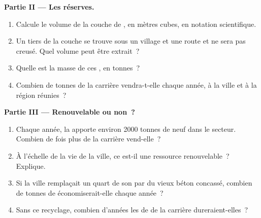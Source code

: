 \begin{problem}
\noindent\textbf{Partie II --- Les réserves.}\par\nopagebreak
\begin{enumerate}[resume, beginpenalty=10000]
  \item Calcule le volume de la couche de , en mètres cubes, en
        notation scientifique.
  \item Un tiers de la couche se trouve sous un village et une route et ne
        sera pas creusé. Quel volume peut être extrait~?
  \item Quelle est la masse de ces , en tonnes~?
  \item Combien de tonnes de  la carrière vendra-t-elle chaque année,
        à la ville et à la région réunies~?
\end{enumerate}

\noindent\textbf{Partie III --- Renouvelable ou non~?}\par\nopagebreak
\begin{enumerate}[resume, beginpenalty=10000]
  \item Chaque année, la  apporte environ \num{2000} tonnes de 
        neuf dans le secteur. Combien de fois plus de  la carrière
        vend-elle~?
  \item À l'échelle de la vie de la ville, ce  est-il une ressource
        renouvelable~? Explique.
  \item Si la ville remplaçait un quart de son  par du vieux béton
        concassé, combien de tonnes de  économiserait-elle chaque
        année~?
  \item Sans ce recyclage, combien d'années les  de  de la
        carrière dureraient-elles~?
\end{enumerate}
\end{problem}

